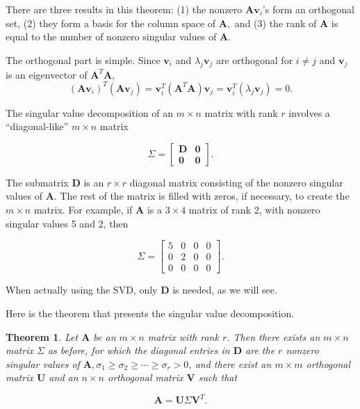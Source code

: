\documentclass[
]{book}
\newtheorem{theorem}{Theorem}[chapter]
\theoremstyle{definition}
\theoremstyle{definition}
\theoremstyle{definition}
\theoremstyle{definition}
\theoremstyle{remark}
\begin{document}
There are three results in this theorem: (1) the nonzero \(\mathbf{A}\mathbf{v}_i\)'s form an orthogonal set, (2) they form a basis for the column space of \(\mathbf{A},\) and (3) the rank of \(\mathbf{A}\) is equal to the number of nonzero singular values of \(\mathbf{A}.\)

The orthogonal part is simple. Since \(\mathbf{v}_i\) and \(\lambda_j\mathbf{v}_j\) are orthogonal for \(i\neq j\) and \(\mathbf{v}_j\) is an eigenvector of \(\mathbf{A}^T\mathbf{A}\),
\[(\mathbf{A}\mathbf{v}_i)^T(\mathbf{A}\mathbf{v}_j)=\mathbf{v}_i^T(\mathbf{A}^T\mathbf{A})\mathbf{v}_j=\mathbf{v}_i^T(\lambda_j\mathbf{v}_j)=0.\]

The singular value decomposition of an \(m\times n\) matrix with rank \(r\) involves a ``diagonal-like'' \(m\times n\) matrix

\[\Sigma=\begin{bmatrix}\mathbf{D} & \mathbf{0}\\\mathbf{0} & \mathbf{0}\end{bmatrix}.\]

The submatrix \(\mathbf{D}\) is an \(r\times r\) diagonal matrix consisting of the nonzero singular values of \(\mathbf{A}.\) The rest of the matrix is filled with zeros, if necessary, to create the \(m \times n\) matrix. For example, if \(\mathbf{A}\) is a \(3\times 4\) matrix of rank 2, with nonzero singular values 5 and 2, then

\[\Sigma=\begin{bmatrix} 5 & 0 & 0 & 0\\0 & 2 & 0 & 0\\0 & 0 & 0 & 0\end{bmatrix}.\]

When actually using the SVD, only \(\mathbf{D}\) is needed, as we will see.

Here is the theorem that presents the singular value decomposition\autocite{LLM}.

\begin{theorembox}

\begin{theorem}
Let \(\mathbf{A}\) be an \(m\times n\) matrix with rank \(r\). Then there exists an \(m\times n\) matrix \(\Sigma\) as before, for which the diagonal entries in \(\mathbf{D}\) are the \(r\) nonzero singular values of \(\mathbf{A},\sigma_1\geq \sigma_2\geq \cdots \geq \sigma_r>0\), and there exist an \(m\times m\) orthogonal matrix \(\mathbf{U}\) and an \(n\times n\) orthogonal matrix \(\mathbf{V}\) such that

\[\mathbf{A}=\mathbf{U}\Sigma\mathbf{V}^T.\]
\end{theorem}

\end{theorembox}
\end{document}
